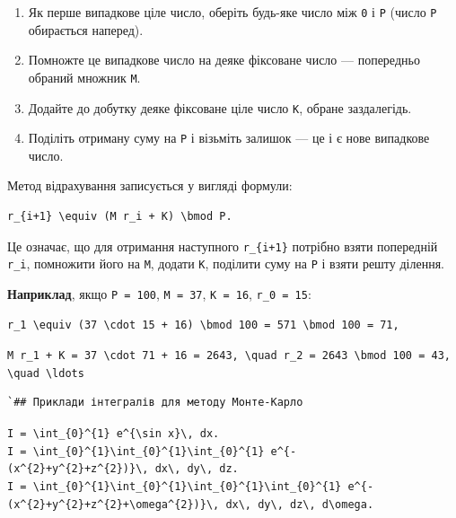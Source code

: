 \documentclass[
  ukrainian,
]{article}
\providecommand{\tightlist}{%
  \setlength{\itemsep}{0pt}\setlength{\parskip}{0pt}}
\begin{document}
\begin{enumerate}
\def\labelenumi{\arabic{enumi}.}
\tightlist
\item
  Як перше випадкове ціле число, оберіть будь-яке число між \texttt{0} і
  \texttt{P} (число \texttt{P} обирається наперед).
\item
  Помножте це випадкове число на деяке фіксоване число --- попередньо
  обраний множник \texttt{M}.
\item
  Додайте до добутку деяке фіксоване ціле число \texttt{K}, обране
  заздалегідь.
\item
  Поділіть отриману суму на \texttt{P} і візьміть залишок --- це і є
  нове випадкове число.
\end{enumerate}

Метод відрахування записується у вигляді формули:

\begin{verbatim}
r_{i+1} \equiv (M r_i + K) \bmod P.
\end{verbatim}

Це означає, що для отримання наступного \texttt{r\_\{i+1\}} потрібно
взяти попередній \texttt{r\_i}, помножити його на \texttt{M}, додати
\texttt{K}, поділити суму на \texttt{P} і взяти решту ділення.

\textbf{Наприклад}, якщо \texttt{P\ =\ 100}, \texttt{M\ =\ 37},
\texttt{K\ =\ 16}, \texttt{r\_0\ =\ 15}:

\begin{verbatim}
r_1 \equiv (37 \cdot 15 + 16) \bmod 100 = 571 \bmod 100 = 71,
\end{verbatim}

\texttt{M\ \textquotesingle{}r\_1\textquotesingle{}\ +\ K\ =\ 37\ \textbackslash{}cdot\ 71\ +\ 16\ =\ 2643,\ \textbackslash{}quad\ r\_2\ =\ 2643\ \textbackslash{}bmod\ 100\ =\ 43,\ \textbackslash{}quad\ \textbackslash{}ldots}

\begin{verbatim}
`## Приклади інтегралів для методу Монте-Карло
\end{verbatim}

\texttt{I\ =\ \textbackslash{}int\_\{0\}\^{}\{1\}\ e\^{}\{\textbackslash{}sin\ x\}\textbackslash{},\ dx.}
\texttt{I\ =\ \textbackslash{}int\_\{0\}\^{}\{1\}\textbackslash{}int\_\{0\}\^{}\{1\}\textbackslash{}int\_\{0\}\^{}\{1\}\ e\^{}\{-(x\^{}\{2\}+y\^{}\{2\}+z\^{}\{2\})\}\textbackslash{},\ dx\textbackslash{},\ dy\textbackslash{},\ dz.}
\texttt{I\ =\ \textbackslash{}int\_\{0\}\^{}\{1\}\textbackslash{}int\_\{0\}\^{}\{1\}\textbackslash{}int\_\{0\}\^{}\{1\}\textbackslash{}int\_\{0\}\^{}\{1\}\ e\^{}\{-(x\^{}\{2\}+y\^{}\{2\}+z\^{}\{2\}+\textbackslash{}omega\^{}\{2\})\}\textbackslash{},\ dx\textbackslash{},\ dy\textbackslash{},\ dz\textbackslash{},\ d\textbackslash{}omega.}
\end{document}
